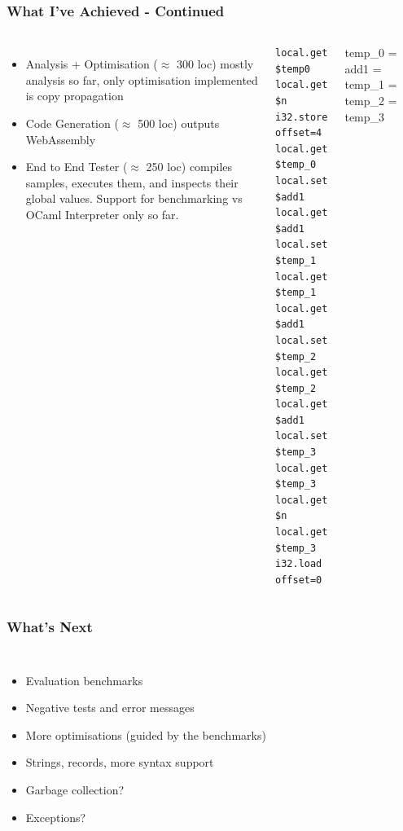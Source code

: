 \documentclass[12pt]{beamer}
\begin{document}
	\begin{frame}[fragile]
		\frametitle{What I've Achieved - Continued}
		\begin{columns}
			\begin{itemize}
				\item Analysis + Optimisation ($\approx$ 300 loc) mostly analysis so far, only optimisation implemented is copy propagation
				\item Code Generation ($\approx$ 500 loc) outputs WebAssembly
				\item End to End Tester ($\approx$ 250 loc) compiles samples, executes them, and inspects their global values. Support for benchmarking vs OCaml Interpreter only so far.
			\end{itemize}
			\begin{center}
				\begin{verbatim}
local.get $temp0
local.get $n
i32.store offset=4
local.get $temp_0
local.set $add1
local.get $add1
local.set $temp_1
local.get $temp_1
local.get $add1
local.set $temp_2
local.get $temp_2
local.get $add1
local.set $temp_3
local.get $temp_3
local.get $n
local.get $temp_3
i32.load offset=0
				\end{verbatim}
			\end{center}
			temp\_0 = add1 = temp\_1 = temp\_2 = temp\_3
		\end{columns}
	\end{frame}

	\begin{frame}[fragile]
		\frametitle{What's Next}
		\begin{columns}
			\column{0.8\linewidth}
			\begin{itemize}
				\item Evaluation benchmarks
				\item Negative tests and error messages
				\item More optimisations (guided by the benchmarks)
				\item Strings, records, more syntax support
				\item Garbage collection?
				\item Exceptions?
			\end{itemize}
			\column{0.2\linewidth}
		\end{columns}
		
	\end{frame}
	
\end{document}
